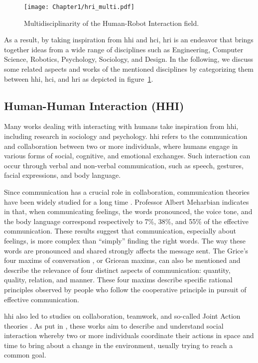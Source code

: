 \begin{figure}[h]
    \center
    \texttt{[image: Chapter1/hri\_multi.pdf]}
    \caption{Multidisciplinarity of the Human-Robot Interaction field.}
    \label{fig:hri_multi}
\end{figure}

As a result, by taking inspiration from \acrfull{hhi} and \acrfull{hci}, \acrshort{hri} is an endeavor that brings together ideas from a wide range of disciplines such as Engineering, Computer Science, Robotics, Psychology, Sociology, and Design.
In the following, we discuss some related aspects and works of the mentioned disciplines by categorizing them between \acrshort{hhi}, \acrshort{hci}, and \acrshort{hri} as depicted in figure~\ref{fig:hri_multi}.

\subsection{Human-Human Interaction (HHI)}

Many works dealing with interacting with humans take inspiration from \acrfull{hhi}, including research in sociology and psychology. \acrshort{hhi} refers to the communication and collaboration between two or more individuals, where humans engage in various forms of social, cognitive, and emotional exchanges. Such interaction can occur through verbal and non-verbal communication, such as speech, gestures, facial expressions, and body language.   

Since communication has a crucial role in collaboration, communication theories have been widely studied for a long time \cite{cherry_human_1957,smith_designing_1998}. Professor Albert Meharbian indicates in \cite{mehrabian1967decoding} that, when communicating feelings, the words pronounced, the voice tone, and the body language correspond respectively to 7\%, 38\%, and 55\% of the effective communication. These results suggest that communication, especially about feelings, is more complex than ``simply'' finding the right words. The way these words are pronounced and shared strongly affects the message sent. The Grice's four maxims of conversation \cite{grice1975logic}, or Gricean maxims, can also be mentioned and describe the relevance of four distinct aspects of communication: quantity, quality, relation, and manner. These four maxims describe specific rational principles observed by people who follow the cooperative principle in pursuit of effective communication.

\acrshort{hhi} also led to studies on collaboration, teamwork, and so-called Joint Action theories \cite{cohen_team_1970,levesque_acting_1990,cohen_teamwork_1991}. As put in \cite{sebanz_2006joint}, these works aim to describe and understand social interaction whereby two or more individuals coordinate their actions in space and time to bring about a change in the environment, usually trying to reach a common goal.

